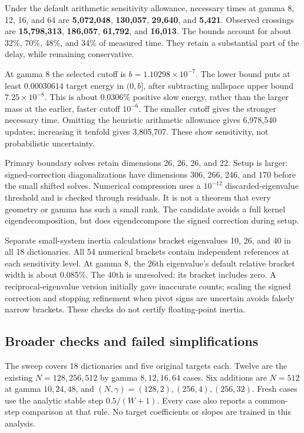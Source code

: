 \documentclass[11pt]{article}
\theoremstyle{definition}
\begin{document}
Under the default arithmetic sensitivity allowance, necessary times at
gamma 8, 12, 16, and 64 are \textbf{5,072,048}, \textbf{130,057},
\textbf{29,640}, and \textbf{5,421}. Observed crossings are
\textbf{15,798,313}, \textbf{186,057}, \textbf{61,792}, and
\textbf{16,013}. The bounds account for about 32\%, 70\%, 48\%, and
34\% of measured time. They retain a substantial part of the delay,
while remaining conservative.

At gamma 8 the selected cutoff is $b=1.10298\times10^{-7}$. The
lower bound puts at least $0.00030614$ target energy in $(0,b]$, after
subtracting nullspace upper bound $7.25\times10^{-8}$. This is about
0.0306\% positive slow energy, rather than the larger mass at the
earlier, faster cutoff $10^{-6}$. The smaller cutoff gives the stronger
necessary time. Omitting the heuristic arithmetic allowance gives
6,978,540 updates; increasing it tenfold gives 3,805,707. These show
sensitivity, not probabilistic uncertainty.

Primary boundary solves retain dimensions 26, 26, 26, and 22. Setup
is larger: signed-correction diagonalizations have dimensions 306, 266,
246, and 170 before the small shifted solves. Numerical compression
uses a $10^{-12}$ discarded-eigenvalue threshold and is checked through
residuals. It is not a theorem that every geometry or gamma has such
a small rank. The candidate avoids a full kernel eigendecomposition,
but does eigendecompose the signed correction during setup.

Separate small-system inertia calculations bracket eigenvalues 10, 26,
and 40 in all 18 dictionaries. All 54 numerical brackets contain
independent references at each sensitivity level. At gamma 8, the 26th
eigenvalue's default relative bracket width is about 0.085\%.
The 40th is unresolved: its bracket includes zero. A reciprocal-eigenvalue
version initially gave inaccurate counts; scaling the signed correction
and stopping refinement when pivot signs are uncertain avoids falsely
narrow brackets. These checks do not certify floating-point inertia.

\subsection*{Broader checks and failed simplifications}
The sweep covers 18 dictionaries and five original targets each.
Twelve are the existing $N=128,256,512$ by gamma $8,12,16,64$ cases.
Six additions are $N=512$ at gamma $10,24,48$, and
$(N,\gamma)=(128,2),(256,4),(256,32)$. Fresh cases use the analytic
stable step $0.5/(W+1)$. Every case also reports a common-step comparison
at that rule. No target coefficients or slopes are trained in this analysis.
\end{document}
